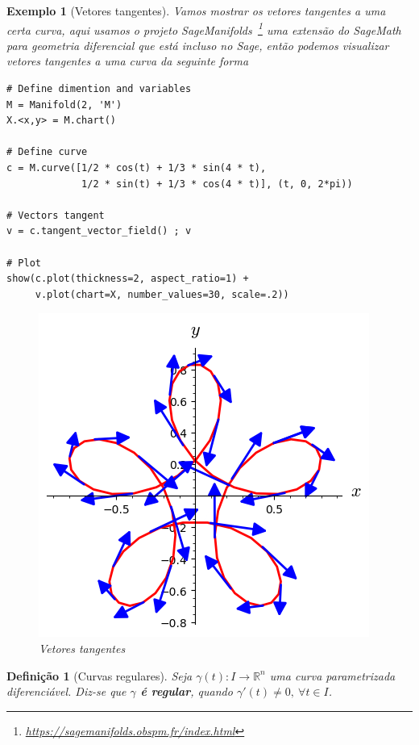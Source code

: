 \documentclass[12pt]{article}
\newtheorem{ex}{Exemplo}[section]
\newtheorem{definition}{Definição}
\newcommand{\furl}[1]{\footnote{\url{#1}}}
\begin{document}
\begin{ex}[Vetores tangentes] Vamos mostrar os vetores tangentes a uma certa curva, aqui usamos o projeto \textit{SageManifolds}~\furl{https://sagemanifolds.obspm.fr/index.html} uma extensão do \textit{SageMath} para geometria diferencial que está incluso no Sage, então podemos visualizar vetores tangentes a uma curva da seguinte forma
\begin{lstlisting}
# Define dimention and variables
M = Manifold(2, 'M')
X.<x,y> = M.chart()

# Define curve
c = M.curve([1/2 * cos(t) + 1/3 * sin(4 * t), 
             1/2 * sin(t) + 1/3 * cos(4 * t)], (t, 0, 2*pi))

# Vectors tangent
v = c.tangent_vector_field() ; v

# Plot
show(c.plot(thickness=2, aspect_ratio=1) +
     v.plot(chart=X, number_values=30, scale=.2))
\end{lstlisting}

\begin{figure}[H]
    \centering
    \includegraphics[scale=.6]{Images/ex1.2.png}
    \caption{Vetores tangentes}
    \label{fig:ex1.2}
\end{figure}

\end{ex}

\begin{definition}[Curvas regulares]
Seja $\gamma (t): I \rightarrow \mathbb{R}^n$ uma curva parametrizada diferenciável. Diz-se que \textbf{$\gamma$ é regular}, quando $\gamma'(t) \neq 0,\ \forall t \in I$.
\end{definition}
\end{document}

